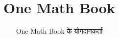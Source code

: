 \documentclass[11pt,a4paper,twoside,openany]{book}
\title{One Math Book}
\author{One Math Book के योगदानकर्ता}
\date{\bookdate}
\begin{document}
\frontmatter



\tableofcontents

\mainmatter



\appendix
\part{\omsolutionspart}


\backmatter
\printindex
\end{document}
